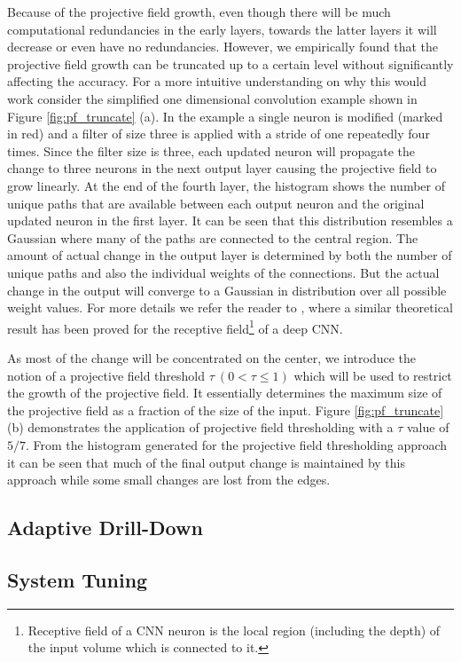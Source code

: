 Because of the projective field growth, even though there will be much computational redundancies in the early layers, towards the latter layers it will decrease or even have no redundancies.
However, we empirically found that the projective field growth can be truncated up to a certain level without significantly affecting the accuracy.
For a more intuitive understanding on why this would work consider the simplified one dimensional convolution example shown in Figure \ref{fig:pf_truncate} (a). In the example a single neuron is modified (marked in red) and a filter of size three is applied with a stride of one repeatedly four times.
Since the filter size is three, each updated neuron will propagate the change to three neurons in the next output layer causing the projective field to grow linearly.
At the end of the fourth layer, the histogram shows the number of unique paths that are available between each output neuron and the original updated neuron in the first layer.
It can be seen that this distribution resembles a Gaussian where many of the paths are connected to the central region.
The amount of actual change in the output layer is determined by both the number of unique paths and also the individual weights of the connections.
But the actual change in the output will converge to a Gaussian in distribution over all possible weight values.
For more details we refer the reader to \cite{luo2016understanding}, where a similar theoretical result has been proved for the receptive field\footnote{Receptive field of a CNN neuron is the local region (including the depth) of the input volume which is connected to it.} of a deep CNN.


As most of the change will be concentrated on the center, we introduce the notion of a projective field threshold $\tau ~ (0 < \tau \leq 1)$ which will be used to restrict the growth of the projective field.
It essentially determines the maximum size of the projective field as a fraction of the size of the input.
Figure \ref{fig:pf_truncate} (b) demonstrates the application of projective field thresholding with a $\tau$ value of $5/7$.
From the histogram generated for the projective field thresholding approach it can be seen that much of the final output change is maintained by this approach while some small changes are lost from the edges.

\subsection{Adaptive Drill-Down}

\subsection{System Tuning}
